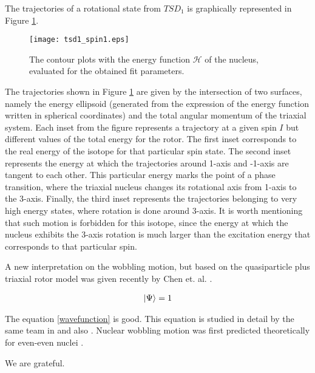 \documentclass{rjparticle}
\begin{document}
The trajectories of a rotational state from $TSD_1$  is graphically represented in Figure \ref{trajectory}.

\begin{figure}[ht]
    \centering
    \texttt{[image: tsd1\_spin1.eps]}
    \caption{The contour plots with the energy function $\mathcal{H}$ of the nucleus, evaluated for the obtained fit parameters.}
    \label{trajectory}
\end{figure}

The trajectories shown in Figure \ref{trajectory} are given by the intersection of two surfaces, namely the energy ellipsoid (generated from the expression of the energy function written in spherical coordinates) and the total angular momentum of the triaxial system. Each inset from the figure represents a trajectory at a given spin $I$ but different values of the total energy for the rotor. The first inset corresponds to the real energy of the isotope for that particular spin state. The second inset represents the energy at which the trajectories around 1-axis and -1-axis are tangent to each other. This particular energy marks the point of a phase transition, where the triaxial nucleus changes its rotational axis from 1-axis to the 3-axis. Finally, the third inset represents the trajectories belonging to very high energy states, where rotation is done around 3-axis. It is worth mentioning that such motion is forbidden for this isotope, since the energy at which the nucleus exhibits the 3-axis rotation is much larger than the excitation energy that corresponds to that particular spin.

A new interpretation on the wobbling motion, but based on the quasiparticle plus triaxial rotor model was given recently by Chen et. al. \cite{chen2020interpretation}.

\begin{align}
    \ket{\Psi}=1
    \label{wavefunction}
\end{align}

The equation \ref{wavefunction} is good. This equation is studied in detail by the same team in \cite{raduta2018wobbling} and also \cite{raduta2020new}.
Nuclear wobbling motion was first predicted theoretically for even-even nuclei \cite{bohr1998nuclear}.


\begin{acknowledgement}
We are grateful.
\end{acknowledgement}
\end{document}
